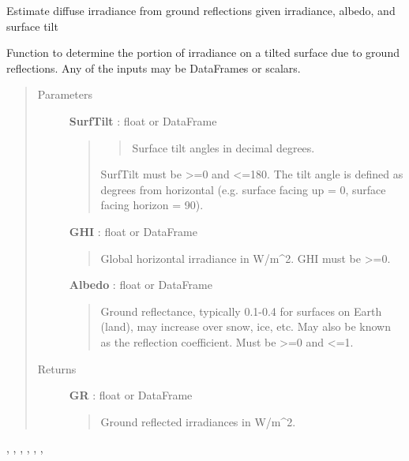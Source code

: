 \documentclass[letterpaper,10pt,english]{sphinxmanual}
\begin{document}
\begin{fulllineitems}
\label{stubs/pvlib.pvl_grounddiffuse:pvlib.pvl_grounddiffuse}
Estimate diffuse irradiance from ground reflections given irradiance, albedo, and surface tilt

Function to determine the portion of irradiance on a tilted surface due
to ground reflections. Any of the inputs may be DataFrames or scalars.
\begin{quote}\begin{description}
\item[{Parameters}] \leavevmode
\textbf{SurfTilt} : float or DataFrame
\begin{quote}
\begin{quote}

Surface tilt angles in decimal degrees.
\end{quote}

SurfTilt must be \textgreater{}=0 and \textless{}=180. The tilt angle is defined as
degrees from horizontal (e.g. surface facing up = 0, surface facing
horizon = 90).
\end{quote}

\textbf{GHI} : float or DataFrame
\begin{quote}

Global horizontal irradiance in W/m\textasciicircum{}2.  
GHI must be \textgreater{}=0.
\end{quote}

\textbf{Albedo} : float or DataFrame
\begin{quote}

Ground reflectance, typically 0.1-0.4 for
surfaces on Earth (land), may increase over snow, ice, etc. May also 
be known as the reflection coefficient. Must be \textgreater{}=0 and \textless{}=1.
\end{quote}

\item[{Returns}] \leavevmode
\textbf{GR} : float or DataFrame
\begin{quote}

Ground reflected irradiances in W/m\textasciicircum{}2.
\end{quote}

\end{description}\end{quote}




{\hyperref[stubs/pvlib.pvl_disc:pvlib.pvl_disc]{}}, {\hyperref[stubs/pvlib.pvl_perez:pvlib.pvl_perez]{}}, {\hyperref[stubs/pvlib.pvl_reindl1990:pvlib.pvl_reindl1990]{}}, {\hyperref[stubs/pvlib.pvl_klucher1979:pvlib.pvl_klucher1979]{}}, {\hyperref[stubs/pvlib.pvl_haydavies1980:pvlib.pvl_haydavies1980]{}}, {\hyperref[stubs/pvlib.pvl_isotropicsky:pvlib.pvl_isotropicsky]{}}, {\hyperref[stubs/pvlib.pvl_kingdiffuse:pvlib.pvl_kingdiffuse]{}}



\end{fulllineitems}
\end{document}
